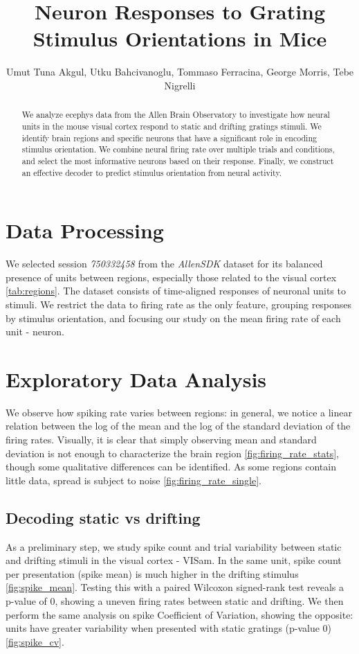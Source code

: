 \documentclass[10pt,twocolumn]{article}
\title{\Large \textbf{Neuron Responses to Grating Stimulus Orientations in Mice}}
\author{
  Umut Tuna Akgul, Utku Bahcivanoglu, Tommaso Ferracina, George Morris, Tebe Nigrelli
}
\begin{document}
\maketitle

\begin{abstract}
We analyze ecephys data from the Allen Brain Observatory to investigate how neural units in the mouse visual cortex respond to static and drifting gratings stimuli. We identify brain regions and specific neurons that have a significant role in encoding stimulus orientation. We combine neural firing rate over multiple trials and conditions, and select the most informative neurons based on their response. Finally, we construct an  effective decoder to predict stimulus orientation from neural activity.
\end{abstract}


\section{Data Processing}

We selected session \textit{750332458} from the \textit{AllenSDK} dataset for its balanced presence of units between regions, especially those related to the visual cortex \ref{tab:regions}. The dataset consists of time-aligned responses of neuronal units to stimuli. We restrict the data to firing rate as the only feature, grouping responses by stimulus orientation, and focusing our study on the mean firing rate of each unit - neuron.

\section{Exploratory Data Analysis}

We observe how spiking rate varies between regions: in general, we notice a linear relation between the log of the mean and the log of the standard deviation of the firing rates. Visually, it is clear that simply observing mean and standard deviation is not enough to characterize the brain region \ref{fig:firing_rate_stats}, though some qualitative differences can be identified. As some regions contain little data, spread is subject to noise \ref{fig:firing_rate_single}.

\subsection{Decoding static vs drifting}

As a preliminary step, we study spike count and trial variability between static and drifting stimuli in the visual cortex - VISam. In the same unit, spike count per presentation (spike mean) is much higher in the drifting stimulus \ref{fig:spike_mean}. Testing this with a paired Wilcoxon signed-rank test reveals a p-value of 0, showing a uneven firing rates between static and drifting. We then perform the same analysis on spike Coefficient of Variation, showing the opposite: units have greater variability when presented with static gratings (p-value 0) \ref{fig:spike_cv}.
\end{document}
